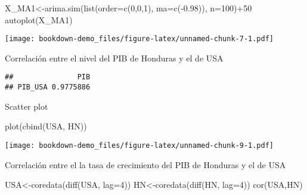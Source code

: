 \documentclass[
]{book}
\newenvironment{Shaded}{\begin{snugshade}}{\end{snugshade}}
\newcommand{\AttributeTok}[1]{\textcolor[rgb]{0.77,0.63,0.00}{#1}}
\newcommand{\DecValTok}[1]{\textcolor[rgb]{0.00,0.00,0.81}{#1}}
\newcommand{\FloatTok}[1]{\textcolor[rgb]{0.00,0.00,0.81}{#1}}
\newcommand{\FunctionTok}[1]{\textcolor[rgb]{0.00,0.00,0.00}{#1}}
\newcommand{\NormalTok}[1]{#1}
\newcommand{\OtherTok}[1]{\textcolor[rgb]{0.56,0.35,0.01}{#1}}
\newcommand{\SpecialCharTok}[1]{\textcolor[rgb]{0.00,0.00,0.00}{#1}}
\newcommand{\StringTok}[1]{\textcolor[rgb]{0.31,0.60,0.02}{#1}}
\begin{document}
\begin{Shaded}
\begin{Highlighting}[]
\NormalTok{X\_MA1}\OtherTok{\textless{}{-}}\FunctionTok{arima.sim}\NormalTok{(}\FunctionTok{list}\NormalTok{(}\AttributeTok{order=}\FunctionTok{c}\NormalTok{(}\DecValTok{0}\NormalTok{,}\DecValTok{0}\NormalTok{,}\DecValTok{1}\NormalTok{), }\AttributeTok{ma=}\FunctionTok{c}\NormalTok{(}\SpecialCharTok{{-}}\FloatTok{0.98}\NormalTok{)), }\AttributeTok{n=}\DecValTok{100}\NormalTok{)}\SpecialCharTok{+}\DecValTok{50}
\FunctionTok{autoplot}\NormalTok{(X\_MA1)}
\end{Highlighting}
\end{Shaded}

\texttt{[image: bookdown-demo\_files/figure-latex/unnamed-chunk-7-1.pdf]}

Correlación entre el nivel del PIB de Honduras y el de USA

\begin{Shaded}
\end{Shaded}

\begin{verbatim}
##               PIB
## PIB_USA 0.9775886
\end{verbatim}

Scatter plot

\begin{Shaded}
\begin{Highlighting}[]
\FunctionTok{plot}\NormalTok{(}\FunctionTok{cbind}\NormalTok{(USA, HN))}
\end{Highlighting}
\end{Shaded}

\texttt{[image: bookdown-demo\_files/figure-latex/unnamed-chunk-9-1.pdf]}

Correlación entre el la tasa de crecimiento del PIB de Honduras y el de USA

\begin{Shaded}
\begin{Highlighting}[]
\NormalTok{USA}\OtherTok{\textless{}{-}}\FunctionTok{coredata}\NormalTok{(}\FunctionTok{diff}\NormalTok{(USA, }\AttributeTok{lag=}\DecValTok{4}\NormalTok{))}
\NormalTok{HN}\OtherTok{\textless{}{-}}\FunctionTok{coredata}\NormalTok{(}\FunctionTok{diff}\NormalTok{(HN, }\AttributeTok{lag=}\DecValTok{4}\NormalTok{))}
\FunctionTok{cor}\NormalTok{(USA,HN)}
\end{Highlighting}
\end{Shaded}
\end{document}
